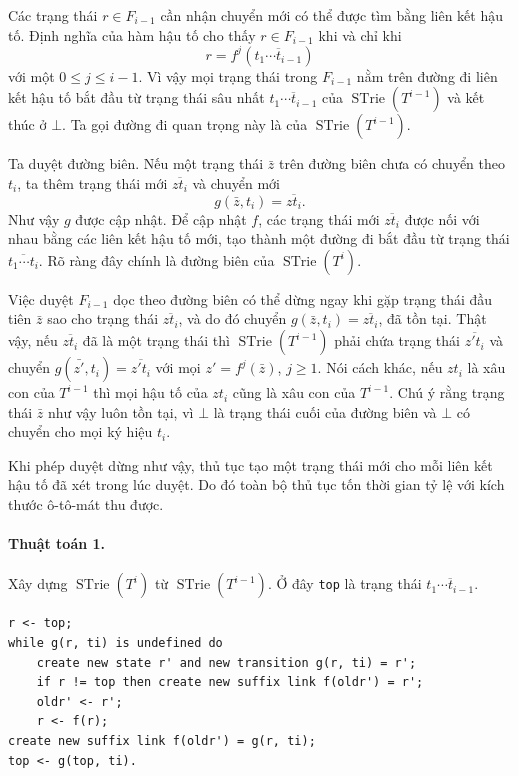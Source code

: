 \documentclass[11pt]{article}
\newcommand{\STrie}{\operatorname{STrie}}
\begin{document}
Các trạng thái $r\in F_{i-1}$ cần nhận chuyển mới có thể được tìm bằng liên
kết hậu tố. Định nghĩa của hàm hậu tố cho thấy $r\in F_{i-1}$ khi và chỉ khi
\[
  r=f^j(\overline{t_1\cdots t_{i-1}})
\]
với một $0\le j\le i-1$. Vì vậy mọi trạng thái trong $F_{i-1}$ nằm trên đường
đi liên kết hậu tố bắt đầu từ trạng thái sâu nhất $\overline{t_1\cdots
t_{i-1}}$ của $\STrie(T^{i-1})$ và kết thúc ở $\bot$. Ta gọi đường đi quan
trọng này là  của $\STrie(T^{i-1})$.

Ta duyệt đường biên. Nếu một trạng thái $\bar{z}$ trên đường biên chưa có
chuyển theo $t_i$, ta thêm trạng thái mới $\overline{zt_i}$ và chuyển mới
\[
  g(\bar{z},t_i)=\overline{zt_i}.
\]
Như vậy $g$ được cập nhật. Để cập nhật $f$, các trạng thái mới
$\overline{zt_i}$ được nối với nhau bằng các liên kết hậu tố mới, tạo thành
một đường đi bắt đầu từ trạng thái $\overline{t_1\cdots t_i}$. Rõ ràng đây
chính là đường biên của $\STrie(T^i)$.

Việc duyệt $F_{i-1}$ dọc theo đường biên có thể dừng ngay khi gặp trạng thái
đầu tiên $\bar{z}$ sao cho trạng thái $\overline{zt_i}$, và do đó chuyển
$g(\bar{z},t_i)=\overline{zt_i}$, đã tồn tại. Thật vậy, nếu
$\overline{zt_i}$ đã là một trạng thái thì $\STrie(T^{i-1})$ phải chứa trạng
thái $\overline{z't_i}$ và chuyển $g(\bar{z'},t_i)=\overline{z't_i}$ với mọi
$z'=f^j(\bar{z})$, $j\ge 1$. Nói cách khác, nếu $zt_i$ là xâu con của
$T^{i-1}$ thì mọi hậu tố của $zt_i$ cũng là xâu con của $T^{i-1}$. Chú ý rằng
trạng thái $\bar{z}$ như vậy luôn tồn tại, vì $\bot$ là trạng thái cuối của
đường biên và $\bot$ có chuyển cho mọi ký hiệu $t_i$.

Khi phép duyệt dừng như vậy, thủ tục tạo một trạng thái mới cho mỗi liên kết
hậu tố đã xét trong lúc duyệt. Do đó toàn bộ thủ tục tốn thời gian tỷ lệ với
kích thước ô-tô-mát thu được.

\paragraph{Thuật toán 1.}
Xây dựng $\STrie(T^i)$ từ $\STrie(T^{i-1})$. Ở đây \texttt{top} là trạng thái
$\overline{t_1\cdots t_{i-1}}$.
\begin{verbatim}
r <- top;
while g(r, ti) is undefined do
    create new state r' and new transition g(r, ti) = r';
    if r != top then create new suffix link f(oldr') = r';
    oldr' <- r';
    r <- f(r);
create new suffix link f(oldr') = g(r, ti);
top <- g(top, ti).
\end{verbatim}
\end{document}
